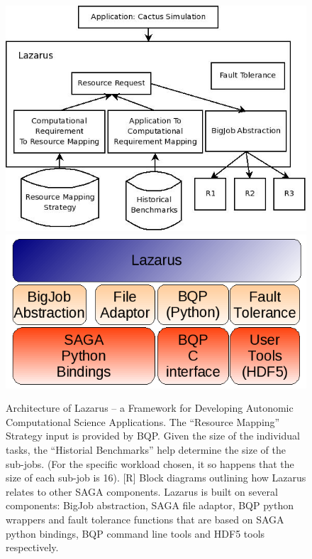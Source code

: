\documentclass{rspublic}
\newcommand{\up}{\vspace*{-0.3em}}
\begin{document}
\begin{figure}
\includegraphics[scale=0.33]{Lazarus_01.jpeg}
\includegraphics[scale=0.44]{Architecture.png}
\caption{Architecture of Lazarus -- a Framework for Developing
  Autonomic Computational Science Applications. The ``Resource
  Mapping'' Strategy input is provided by BQP. Given the size of the
  individual tasks, the ``Historial Benchmarks'' help determine the
  size of the sub-jobs. (For the specific workload chosen, it so
  happens that the size of each sub-job is 16). [R] Block diagrams
  outlining how Lazarus relates to other SAGA components. Lazarus is
  built on several components: BigJob abstraction, SAGA file adaptor,
  BQP python wrappers and fault tolerance functions that are based on
  SAGA python bindings, BQP command line tools and HDF5 tools
  respectively.}
\label{fig:application_architecture}
\end{figure}

\end{document}
